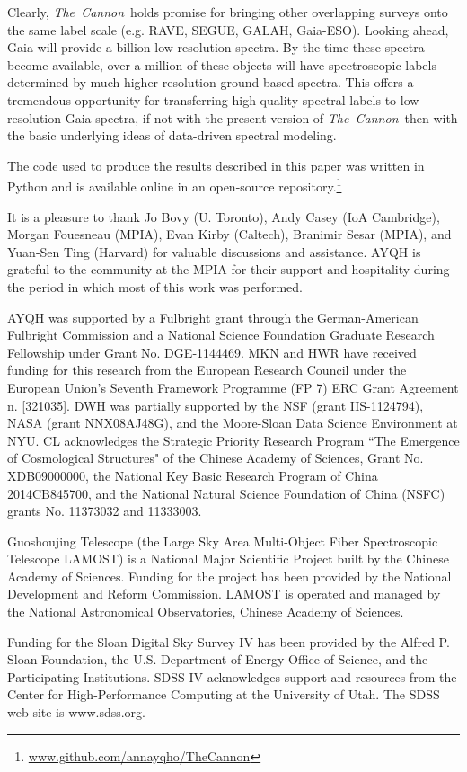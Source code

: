 \documentclass[12pt, letterpaper, preprint]{aastex}
\newcommand{\tc}{\textsl{The~Cannon}}
\newcommand{\segue}{SEGUE}
\newcommand{\rave}{RAVE}
\newcommand{\galah}{GALAH}
\newcommand{\gaiaeso}{Gaia-ESO}
\begin{document}
Clearly, \tc\ holds promise for bringing other overlapping surveys
onto the same label scale (e.g. \rave, \segue, \galah, \gaiaeso). Looking ahead, Gaia will provide a billion low-resolution spectra.
By the time these spectra become available, over a million of these objects will have spectroscopic labels determined by much higher resolution ground-based spectra. This offers a tremendous 
opportunity for transferring high-quality spectral labels to low-resolution Gaia spectra, if not with the present version of \tc\ then with the basic underlying ideas of data-driven spectral modeling.

The code used to produce the results described in this paper was written in
Python and is available online in an open-source repository.\footnote{\url{www.github.com/annayqho/TheCannon}}

\acknowledgements

It is a pleasure to thank 
Jo Bovy (U. Toronto),
Andy Casey (IoA Cambridge),
Morgan Fouesneau (MPIA), 
Evan Kirby (Caltech),
Branimir Sesar (MPIA), and
Yuan-Sen Ting (Harvard)
for valuable discussions and assistance.
AYQH is grateful to the community at the MPIA for 
their support and hospitality during the period in which most of this work was performed. 

AYQH was supported by a Fulbright grant through the German-American Fulbright Commission and a National Science Foundation Graduate Research Fellowship under Grant No. DGE‐1144469. 
MKN and HWR have received funding for this research from the European Research Council under the European Union's Seventh Framework Programme (FP 7) ERC Grant Agreement n. [321035].
DWH was partially supported by the NSF (grant IIS-1124794), NASA (grant NNX08AJ48G), and the Moore-Sloan Data Science Environment at NYU.
CL acknowledges the Strategic Priority Research Program ``The Emergence of Cosmological Structures" of the Chinese Academy of Sciences, Grant No. XDB09000000, the National Key Basic Research Program of China 2014CB845700, and the National Natural Science Foundation of China (NSFC) grants No. 11373032 and 11333003.

Guoshoujing Telescope (the Large Sky Area Multi-Object Fiber Spectroscopic Telescope LAMOST) is a National Major Scientific Project built by the Chinese Academy of Sciences. Funding for the project has been provided by the National Development and Reform Commission. LAMOST is operated and managed by the National Astronomical Observatories, Chinese Academy of Sciences.

Funding for the Sloan Digital Sky Survey IV has been provided by
the Alfred P. Sloan Foundation, the U.S. Department of Energy Office of
Science, and the Participating Institutions. SDSS-IV acknowledges
support and resources from the Center for High-Performance Computing at
the University of Utah. The SDSS web site is www.sdss.org.
\end{document}
